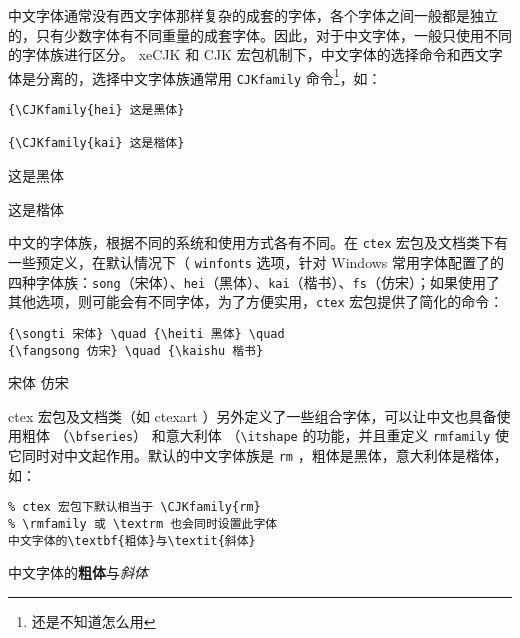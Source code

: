 中文字体通常没有西文字体那样复杂的成套的字体，各个字体之间一般都是独立的，只有少数字体有不同重量的成套字体。因此，对于中文字体，一般只使用不同的字体族进行区分。 xeCJK 和 CJK 宏包机制下，中文字体的选择命令和西文字体是分离的，选择中文字体族通常用 \verb|CJKfamily| 命令\footnote{还是不知道怎么用}，如：

\begin{minipage}[t]{0.45\textwidth}
\begin{lstlisting}
{\CJKfamily{hei} 这是黑体}

{\CJKfamily{kai} 这是楷体}
\end{lstlisting}
\end{minipage}
\hfill
\begin{minipage}[t]{0.45\textwidth}
    {\heiti 这是黑体}

    {\kaishu 这是楷体}
\end{minipage}

中文的字体族，根据不同的系统和使用方式各有不同。在 \verb|ctex| 宏包及文档类下有一些预定义，在默认情况下（ \verb|winfonts| 选项，针对 Windows 常用字体配置了的四种字体族：\verb|song|（宋体）、\verb|hei|（黑体）、\verb|kai|（楷书）、\verb|fs|（仿宋）；如果使用了其他选项，则可能会有不同字体，为了方便实用，\verb|ctex| 宏包提供了简化的命令：

\begin{minipage}[t]{0.45\textwidth}
\begin{lstlisting}
{\songti 宋体} \quad {\heiti 黑体} \quad
{\fangsong 仿宋} \quad {\kaishu 楷书}
\end{lstlisting}
\end{minipage}
\hfill
\begin{minipage}[t]{0.45\textwidth}
    {\songti 宋体}  \quad
    {\fangsong 仿宋} 
\end{minipage}

ctex 宏包及文档类（如 ctexart ）另外定义了一些组合字体，可以让中文也具备使用粗体 （\verb|\bfseries|） 和意大利体 （\verb|\itshape| 的功能，并且重定义 \verb|rmfamily| 使它同时对中文起作用。默认的中文字体族是 \verb|rm| ，粗体是黑体，意大利体是楷体，如：

\begin{minipage}[t]{0.45\textwidth}
\begin{lstlisting}
% ctex 宏包下默认相当于 \CJKfamily{rm}
% \rmfamily 或 \textrm 也会同时设置此字体
中文字体的\textbf{粗体}与\textit{斜体}
\end{lstlisting}
\end{minipage}
\hfill
\begin{minipage}[t]{0.45\textwidth}
中文字体的\textbf{粗体}与\textit{斜体}
\end{minipage}

